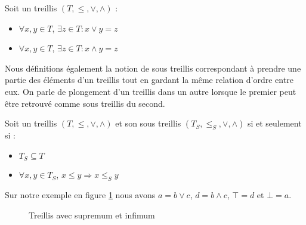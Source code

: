 \begin{definition}[Treillis]
Soit un treillis $(T, \leq, \vee, \wedge)$ :
\begin{itemize}
	\item $\forall x, y \in T$, $\exists z \in T : x \vee y = z$
	\item $\forall x, y \in T$, $\exists z \in T : x \wedge y = z$
\end{itemize}
\end{definition}

Nous définitions également la notion de sous treillis correspondant à prendre une partie des éléments d'un treillis tout en gardant la même relation d'ordre entre eux. On parle de plongement d'un treillis dans un autre lorsque le premier peut être retrouvé comme sous treillis du second.

\begin{definition}
Soit un treillis $(T, \leq, \vee, \wedge)$ et son sous treillis $(T_S, \leq_S, \vee, \wedge)$ si et seulement si :
\begin{itemize}
	\item $T_S \subseteq T$
	\item $\forall x, y \in T_S$, $x \leq y \Rightarrow x \leq_S y$
\end{itemize}
\end{definition}

Sur notre exemple en figure \ref{treillis_sup_inf} nous avons $a = b \vee c$, $d = b \wedge c$, $\top = d$ et $\bot = a$.

\begin{figure}[H]
	\begin{minipage}{0.5\textwidth}
	\begin{center}
	\end{center}
	\end{minipage}
	\begin{minipage}{0.5\textwidth}
	\begin{center}
	\end{center}
	\end{minipage}
	\caption{Treillis avec supremum et infimum}
	\label{treillis_sup_inf}
\end{figure}

